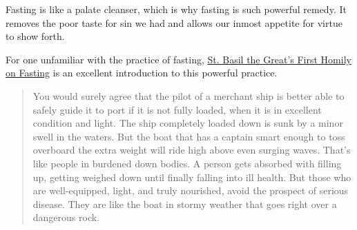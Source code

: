 \documentclass[letterpaper]{article}
\begin{document}
Fasting is like a palate cleanser, which is why fasting is such powerful remedy. It removes the poor taste for sin we had and allows our inmost appetite for virtue to show forth.

For one unfamiliar with the practice of fasting, \href{http://rutgersnb.occministries.org/wp-content/uploads/2015/07/St.-Basil-the-Great%E2%80%99s-First-Homily-on-Fasting.pdf}{St. Basil the Great's First Homily on Fasting} is an excellent introduction to this powerful practice. 

\begin{quote}
  You would surely agree that the pilot of a merchant ship is better able to safely guide it to port if it is not fully loaded, when it is in excellent condition and light. The ship completely loaded down is sunk by a minor swell in the waters. But the boat that has a captain smart enough to toss overboard the extra weight will ride high above even surging waves.
  That’s like people in burdened down bodies. A person gets absorbed with filling up, getting weighed down until finally falling into ill health. But those who are well-equipped, light, and truly nourished, avoid the prospect of serious disease. They are like the boat in stormy weather that goes right over a dangerous rock.
\end{quote}

\iffalse
\begin{quote}
  Wine wasn’t in paradise; there was not yet any slaughtering of animals, not yet any eating of meat. After the flood there was wine. After the flood, ``you will eat all kinds of things, like you eat vegetables that grow from the ground." When perfection was despaired, then the enjoyment of those things was allowed.
  Now the wine is an example of inexperience, as Noah was ignorant of the use of wine. For it had not yet come into use in life, neither been known in human custom. Since he had neither seen another do it, nor tried it himself, he was unguardedly hurt by it. ``For Noah planted a vineyard, and he drank from the fruit, and he got drunk." He wasn’t out-of-control drunk, he just wasn’t aware of the potent thing he was consuming.
  \attrib{\textit{On Fasting} 5, St. Basil}
\end{quote}

\begin{quote}
  What did Esau throw away, and so was made a slave of his brother? Didn’t he sell his rights as first-born for a single meal? By contrast, wasn’t it with fasting and prayer that Hannah was favored to become the mother of Samuel?
  \attrib{\textit{On Fasting} 6, St. Basil}
\end{quote}
\fi
\end{document}
